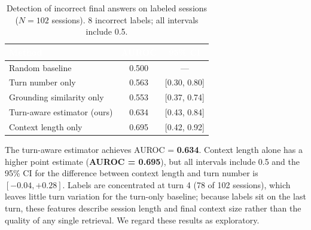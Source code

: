\documentclass[11pt,a4paper]{article}
\begin{document}
\begin{table}[H]
\centering
\renewcommand{\arraystretch}{1.35}
\begin{tabular}{lcc}
\toprule
\rowcolor{headerblue}
\textcolor{white}{\textbf{Method}} &
\textcolor{white}{\textbf{AUROC}} &
\textcolor{white}{\textbf{95\% CI}} \\
\midrule
\rowcolor{rowgray} Random baseline             & 0.500   & ---          \\
Turn number only                               & 0.563   & [0.30, 0.80] \\
\rowcolor{rowgray} Grounding similarity only   & 0.553   & [0.37, 0.74] \\
\rowcolor{rowhighlight} Turn-aware estimator (ours) & 0.634 & [0.43, 0.84] \\
\rowcolor{rowgray} Context length only         & 0.695   & [0.42, 0.92] \\
\bottomrule
\end{tabular}
\caption{Detection of incorrect final answers on labeled sessions ($N=102$ sessions). 8 incorrect labels; all
intervals include 0.5.}
\end{table}

The turn-aware estimator achieves AUROC = \textbf{0.634}. Context length alone has a higher point estimate
(\textbf{AUROC = 0.695}), but all intervals include 0.5 and the 95\% CI for the difference between context length
and turn number is $[-0.04, +0.28]$. Labels are concentrated at turn 4 (78 of 102 sessions), which leaves little
turn variation for the turn-only baseline; because labels sit on the last turn, these features describe session
length and final context size rather than the quality of any single retrieval. We regard these results as
exploratory.
\end{document}
